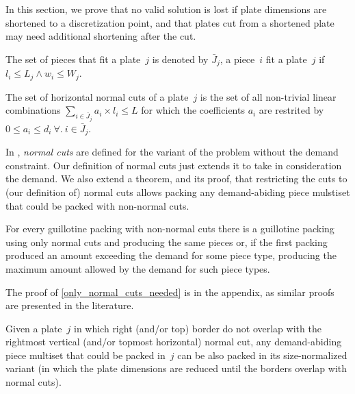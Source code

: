 \documentclass[runningheads]{llncs}
\begin{document}
In this section, we prove that no valid solution is lost if plate dimensions are shortened to a discretization point, and that plates cut from a shortened plate may need additional shortening after the cut.

\begin{definition}
The set of pieces that fit a plate~\(j\) is denoted by \(\bar{J}_j\), a piece~\(i\) fit a plate~\(j\) if \(l_i \leq L_j \land w_i \leq W_j\).
\end{definition}

\begin{definition}
The set of horizontal normal cuts of a plate~\(j\) is the set of all non-trivial linear combinations \(\sum_{i \in \bar{J}_j} a_i \times l_i \leq L\) for which the coefficients \(a_i\) are restrited by \(0 \leq a_i \leq d_i~\forall.~i \in \bar{J}_j\).
\end{definition}

In \cite{nicos:1977}, \emph{normal cuts} are defined for the variant of the problem without the demand constraint.
Our definition of normal cuts just extends it to take in consideration the demand.
We also extend a theorem, and its proof, that restricting the cuts to (our definition of) normal cuts allows packing any demand-abiding piece mulstiset that could be packed with non-normal cuts.

\begin{theorem}\label{only_normal_cuts_needed}
For every guillotine packing with non-normal cuts there is a guillotine packing using only normal cuts and producing the same pieces or, if the first packing produced an amount exceeding the demand for some piece type, producing the maximum amount allowed by the demand for such piece types.
\end{theorem}

The proof of \autoref{only_normal_cuts_needed} is in the appendix, as similar proofs are presented in the literature.

\begin{corollary}\label{co:size_normalized_plate}
Given a plate~\(j\) in which right (and/or top) border do not overlap with the rightmost vertical (and/or topmost horizontal) normal cut, any demand-abiding piece multiset that could be packed in~\(j\) can be also packed in its size-normalized variant (in which the plate dimensions are reduced until the borders overlap with normal cuts).
\end{corollary}
\end{document}
